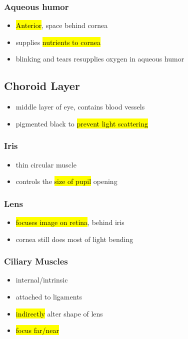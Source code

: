 \documentclass[a4paper,12pt]{article}
\begin{document}
\subsubsection{Aqueous humor}
\begin{itemize}
    \item{\hl{Anterior}, space behind cornea}
    \item{supplies \hl{nutrients to cornea}}
    \item{blinking and tears resupplies oxygen in aqueous humor}
\end{itemize}

\subsection{Choroid Layer}
\begin{itemize}
    \item{middle layer of eye, contains blood vessels}
    \item{pigmented black to \hl{prevent light scattering}}
\end{itemize}

\subsubsection{Iris}
\begin{itemize}
    \item{thin circular muscle}
    \item{controls the \hl{size of pupil} opening}
\end{itemize}

\subsubsection{Lens}
\begin{itemize}
    \item{\hl{focuses image on retina}, behind iris}
    \item{cornea still does most of light bending}
\end{itemize}

\subsubsection{Ciliary Muscles}
\begin{itemize}
    \item{internal/intrinsic}
    \item{attached to ligaments}
    \item{\hl{indirectly} alter shape of lens}
    \item{\hl{focus far/near}}
\end{itemize}
\end{document}
